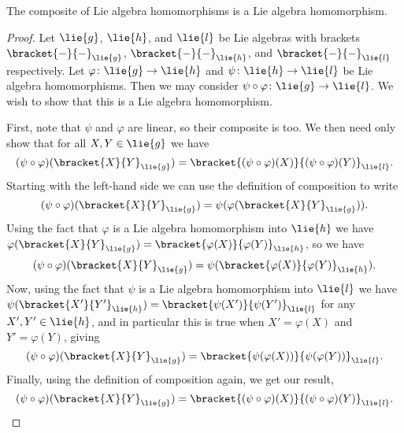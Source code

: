 \documentclass[fleqn]{NotesClass}
\begin{document}
    \begin{lma}{}{}
        The composite of Lie algebra homomorphisms is a Lie algebra homomorphism.
        \begin{proof}
            Let \(\lie{g}\), \(\lie{h}\), and \(\lie{l}\) be Lie algebras with brackets \(\bracket{-}{-}_{\lie{g}}\), \(\bracket{-}{-}_{\lie{h}}\), and \(\bracket{-}{-}_{\lie{l}}\) respectively.
            Let \(\varphi \colon \lie{g} \to \lie{h}\) and \(\psi \colon \lie{h} \to \lie{l}\) be Lie algebra homomorphisms.
            Then we may consider \(\psi \circ \varphi \colon \lie{g} \to \lie{l}\).
            We wish to show that this is a Lie algebra homomorphism.
            
            First, note that \(\psi\) and \(\varphi\) are linear, so their composite is too.
            We then need only show that for all \(X, Y \in \lie{g}\) we have
            \begin{equation}
                (\psi \circ \varphi)(\bracket{X}{Y}_{\lie{g}}) = \bracket{(\psi \circ \varphi)(X)}{(\psi \circ \varphi)(Y)}_{\lie{l}}.
            \end{equation}
            Starting with the left-hand side we can use the definition of composition to write
            \begin{equation}
                (\psi \circ \varphi)(\bracket{X}{Y}_{\lie{g}}) = \psi(\varphi(\bracket{X}{Y}_{\lie{g}})).
            \end{equation}
            Using the fact that \(\varphi\) is a Lie algebra homomorphism into \(\lie{h}\) we have \(\varphi(\bracket{X}{Y}_{\lie{g}}) = \bracket{\varphi(X)}{\varphi(Y)}_{\lie{h}}\), so we have
            \begin{equation}
                (\psi \circ \varphi)(\bracket{X}{Y}_{\lie{g}}) = \psi(\bracket{\varphi(X)}{\varphi(Y)}_{\lie{h}}).
            \end{equation}
            Now, using the fact that \(\psi\) is a Lie algebra homomorphism into \(\lie{l}\) we have \(\psi(\bracket{X'}{Y'}_{\lie{h}}) = \bracket{\psi(X')}{\psi(Y')}_{\lie{l}}\) for any \(X', Y' \in \lie{h}\), and in particular this is true when \(X' = \varphi(X)\) and \(Y' = \varphi(Y)\), giving
            \begin{equation}
                (\psi \circ \varphi)(\bracket{X}{Y}_{\lie{g}}) = \bracket{\psi(\varphi(X))}{\psi(\varphi(Y))}_{\lie{l}}.
            \end{equation}
            Finally, using the definition of composition again, we get our result,
            \begin{equation}
                (\psi \circ \varphi)(\bracket{X}{Y}_{\lie{g}}) = \bracket{(\psi \circ \varphi)(X)}{(\psi \circ \varphi)(Y)}_{\lie{l}}. \qedhere
            \end{equation}
        \end{proof}
    \end{lma}
    
\end{document}
